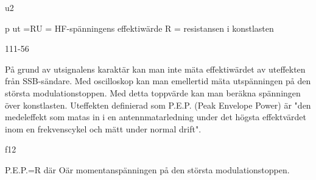 u2

p
ut =RU = HF-spänningens effektiwärde
R = resistansen i konstlasten

111-56

På grund av utsignalens karaktär kan
man inte mäta effektiwärdet av uteffekten
från SSB-sändare.
Med oscilloskop kan man emellertid mäta
utspänningen på den största modulationstoppen.
Med detta toppvärde kan man beräkna
spänningen över konstlasten.
Uteffekten definierad som P.E.P. (Peak
Envelope Power) är "den medeleffekt som
matas in i en antennmatarledning under det
högsta effektvärdet inom en frekvenscykel
och mätt under normal drift".

f12

P.E.P.=R
där Oär momentanspänningen på den största
modulationstoppen.


